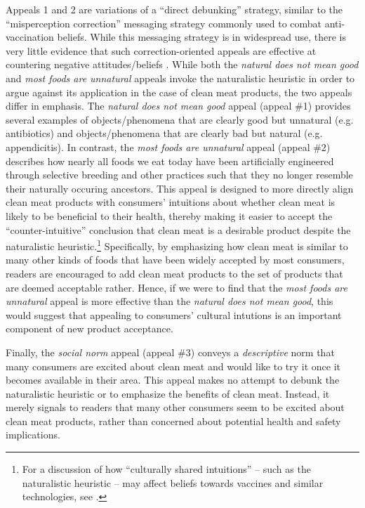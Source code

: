 \documentclass[12pt]{article}
\newcommand{\todo}[1]{\textit{\textcolor{red}{$<$todo$>$ #1 $<$/todo$>$}}}
\begin{document}

Appeals 1 and 2 are variations of a ``direct debunking'' strategy, similar to the ``misperception correction'' messaging strategy commonly used to combat anti-vaccination beliefs. While this messaging strategy is in widespread use, there is very little evidence that such correction-oriented appeals are effective at countering negative attitudes/beliefs \citep{Nyhan2015,Nyhan2014}. While both the \textit{natural does not mean good} and \textit{most foods are unnatural} appeals invoke the naturalistic heuristic in order to argue against its application in the case of clean meat products, the two appeals differ in emphasis. The \textit{natural does not mean good} appeal (appeal \#1) provides several examples of objects/phenomena that are clearly good but unnatural (e.g. antibiotics) and objects/phenomena that are clearly bad but natural (e.g. appendicitis). In contrast, the \textit{most foods are unnatural} appeal (appeal \#2) describes how nearly all foods we eat today have been artificially engineered through selective breeding and other practices such that they no longer resemble their naturally occuring ancestors. This appeal is designed to more directly align clean meat products with consumers' intuitions about whether clean meat is likely to be beneficial to their health, thereby making it easier to accept the ``counter-intuitive'' conclusion that clean meat is a desirable product despite the naturalistic heuristic.\footnote{For a discussion of how ``culturally shared intuitions'' -- such as the naturalistic heuristic -- may affect beliefs towards vaccines and similar technologies, see \citet{Miton2015}.} Specifically, by emphasizing how clean meat is similar to many other kinds of foods that have been widely accepted by most consumers, readers are encouraged to add clean meat products to the set of products that are deemed acceptable rather. Hence, if we were to find that the \textit{most foods are unnatural} appeal is more effective than the \textit{natural does not mean good}, this would suggest that appealing to consumers' cultural intutions is an important component of new product acceptance.

Finally, the \textit{social norm} appeal (appeal \#3) conveys a \textit{descriptive} norm that many consumers are excited about clean meat and would like to try it once it becomes available in their area. This appeal makes no attempt to debunk the naturalistic heuristic or to emphasize the benefits of clean meat. Instead, it merely signals to readers that many other consumers seem to be excited about clean meat products, rather than concerned about potential health and safety implications.
\end{document}
